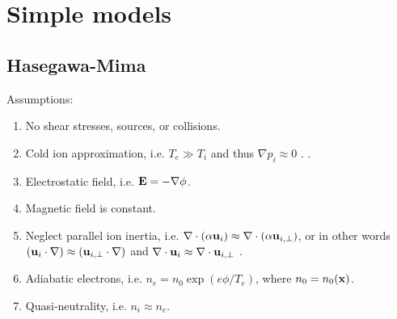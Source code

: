 \documentclass[oneside,a4paper,11pt]{report}
\begin{document}
\chapter{Simple models}
\section{Hasegawa-Mima}
Assumptions:
\begin{enumerate}
    \item No shear stresses, sources, or collisions. \label{it:no_shear_source_coll}
    \item Cold ion approximation, i.e. $T_e \gg T_i$ and thus $\nabla p_i \approx 0$ \cite{hasegawa1977}. \label{it:cold}.
    \item Electrostatic field, i.e. $\mathbf{E} = - \nabla \phi$. \label{it:electrostatic}
    \item Magnetic field is constant.
    \item Neglect parallel ion inertia, i.e. $\nabla \cdot (\alpha \mathbf{u}_i) \approx \nabla \cdot (\alpha \mathbf{u}_{i,\perp})$, or in other words $(\mathbf{u}_i \cdot \nabla) \approx (\mathbf{u}_{i,\perp} \cdot \nabla)$ and $\nabla \cdot \mathbf{u}_i \approx \nabla \cdot \mathbf{u}_{i,\perp}$ \cite{hasegawa1977}. \label{it:par_ion}
    \item Adiabatic electrons, i.e. $n_e = n_0 \exp (e\phi/T_e)$, where $n_0 = n_0(\mathbf{x})$. \label{it:adiabatic}
    \item Quasi-neutrality, i.e. $n_i \approx n_e$. \label{it:quasineutrality}
\end{enumerate}
\end{document}
